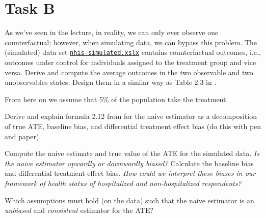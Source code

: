 \section*{Task B}

\begin{boenumerate}
  \item As we've seen in the lecture, in reality, we can only ever observe one counterfactual; however, when simulating data, we can bypass this problem. The (simulated) data set  \href{https://github.com/HumanCapitalAnalysis/microeconometrics/tree/peisenha_integration_problem_set/problem-sets/01-potential-outcome-model/data}{\texttt{nhis-simulated.xslx}} contains counterfactual outcomes, i.e., outcomes under control for individuals assigned to the treatment group and vice versa. Derive and compute the average outcomes in the two observable and two unobservables states; Design them in a similar way as Table 2.3 in \cite{Morgan.2014}.

\end{boenumerate}

\noindent From here on we assume that 5$\%$ of the population take the treatment.

\begin{boenumerate}\setcounter{enumi}{1}

\item Derive and explain formula 2.12 from \cite{Morgan.2014} for the naive estimator as a decomposition of true ATE, baseline bias, and differential treatment effect bias (do this with pen and paper).

\item Compute the naive estimate and true value of the ATE for the simulated data. \emph{Is the naive estimator upwardly or downwardly biased?} Calculate the baseline bias and differential treatment effect bias. \emph{How could we interpret these biases in our framework of health status of hospitalized and  non-hospitalized respondents?}

\item Which assumptions must hold (on the data) such that the naive estimator is an \emph{unbiased} and \emph{consistent} estimator for the ATE?

\end{boenumerate}

\nocite{Angrist.2008}
\nocite{NHIS}





